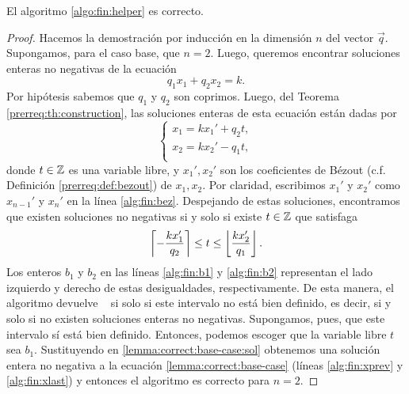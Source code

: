 \begin{theorem}
	\label{th:fin:helper:correct}
	El algoritmo \ref{algo:fin:helper} es correcto.
\end{theorem}
\begin{proof}
	Hacemos la demostración por inducción en la dimensión $n$ del vector $\vec{q}$. Supongamos, para
	el caso base, que $n = 2$. Luego, queremos encontrar soluciones enteras no negativas de la
	ecuación
	\begin{equation}
		\label{lemma:correct:base-case}
		q_1x_1 + q_2x_2 = k.
	\end{equation}
	Por hipótesis sabemos que $q_1$ y $q_2$ son coprimos. Luego, del Teorema
	\ref{prerreq:th:construction}, las soluciones enteras de esta ecuación están dadas por
	\begin{equation}
		\label{lemma:correct:base-case:sol}
		\begin{cases}
			x_1 = kx_1' + q_2t, \\
			x_2 = kx_2' - q_1t, \\
		\end{cases}
	\end{equation}
	donde $t \in \mathbb{Z}$ es una variable libre, y $x_1', x_2'$ son los coeficientes de Bézout (c.f.
	Definición \ref{prerreq:def:bezout}) de $x_1, x_2$. Por claridad, escribimos $x_1'$ y $x_2'$
	como $x_{n-1}'$ y $x_{n}'$ en la línea \eqref{alg:fin:bez}. Despejando de estas soluciones,
	encontramos que existen soluciones no negativas si y solo si existe $t \in \mathbb{Z}$ que satisfaga
	\begin{equation*}
		\left\lceil -\frac{kx_1'}{q_2} \right\rceil \leq t \leq \left\lfloor \frac{kx_2'}{q_1} \right\rfloor.
	\end{equation*}
	Los enteros $b_1$ y $b_2$ en las líneas \eqref{alg:fin:b1} y \eqref{alg:fin:b2} representan el
	lado izquierdo y derecho de estas desigualdades, respectivamente. De esta manera, el algoritmo
	devuelve \NIL~ si solo si este intervalo no está bien definido, es decir, si y solo si no existen
	soluciones enteras no negativas. Supongamos, pues, que este intervalo sí está bien definido.
	Entonces, podemos escoger que la variable libre $t$ sea $b_1$. Sustituyendo en
	\eqref{lemma:correct:base-case:sol} obtenemos una solución entera no negativa a la ecuación
	\eqref{lemma:correct:base-case} (líneas \eqref{alg:fin:xprev} y \eqref{alg:fin:xlast}) y entonces
	el algoritmo es correcto para $n = 2$.


\end{proof}
